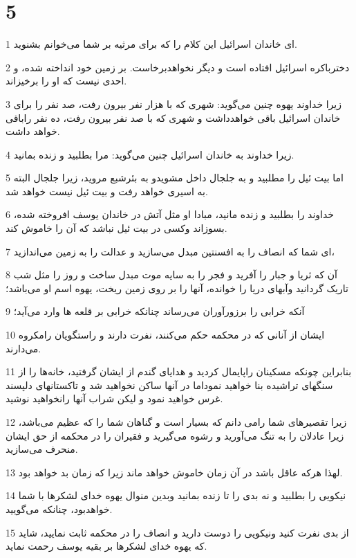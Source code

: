 \chapter{5}

\par 1 ای خاندان اسرائیل این کلام را که برای مرثیه بر شما می‌خوانم بشنوید.
\par 2 دخترباکره اسرائیل افتاده است و دیگر نخواهدبرخاست. بر زمین خود انداخته شده، و احدی نیست که او را برخیزاند.
\par 3 زیرا خداوند یهوه چنین می‌گوید: شهری که با هزار نفر بیرون رفت، صد نفر را برای خاندان اسرائیل باقی خواهدداشت و شهری که با صد نفر بیرون رفت، ده نفر راباقی خواهد داشت.
\par 4 زیرا خداوند به خاندان اسرائیل چنین می‌گوید: مرا بطلبید و زنده بمانید.
\par 5 اما بیت ئیل را مطلبید و به جلجال داخل مشویدو به بئرشبع مروید، زیرا جلجال البته به اسیری خواهد رفت و بیت ئیل نیست خواهد شد.
\par 6 خداوند را بطلبید و زنده مانید، مبادا او مثل آتش در خاندان یوسف افروخته شده، بسوزاند وکسی در بیت ئیل نباشد که آن را خاموش کند.
\par 7 ‌ای شما که انصاف را به افسنتین مبدل می‌سازید و عدالت را به زمین می‌اندازید،
\par 8 آن که ثریا و جبار را آفرید و فجر را به سایه موت مبدل ساخت و روز را مثل شب تاریک گردانید وآبهای دریا را خوانده، آنها را بر روی زمین ریخت، یهوه اسم او می‌باشد؛
\par 9 آنکه خرابی را برزورآوران می‌رساند چنانکه خرابی بر قلعه ها وارد می‌آید؛
\par 10 ایشان از آنانی که در محکمه حکم می‌کنند، نفرت دارند و راستگویان رامکروه می‌دارند.
\par 11 بنابراین چونکه مسکینان راپایمال کردید و هدایای گندم از ایشان گرفتید، خانه‌ها را از سنگهای تراشیده بنا خواهید نموداما در آنها ساکن نخواهید شد و تاکستانهای دلپسند غرس خواهید نمود و لیکن شراب آنها رانخواهید نوشید.
\par 12 زیرا تقصیرهای شما رامی دانم که بسیار است و گناهان شما را که عظیم می‌باشد، زیرا عادلان را به تنگ می‌آورید و رشوه می‌گیرید و فقیران را در محکمه از حق ایشان منحرف می‌سازید.
\par 13 لهذا هر‌که عاقل باشد در آن زمان خاموش خواهد ماند زیرا که زمان بد خواهد بود.
\par 14 نیکویی را بطلبید و نه بدی را تا زنده بمانید وبدین منوال یهوه خدای لشکرها با شما خواهدبود، چنانکه می‌گویید.
\par 15 از بدی نفرت کنید ونیکویی را دوست دارید و انصاف را در محکمه ثابت نمایید، شاید که یهوه خدای لشکرها بر بقیه یوسف رحمت نماید.
